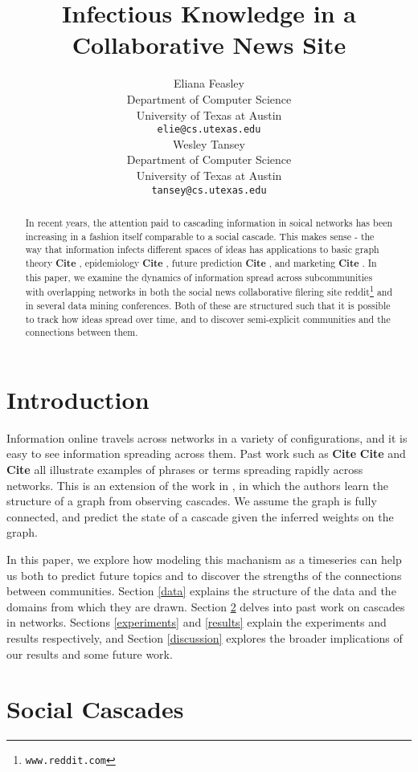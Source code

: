 \documentclass{article} %
\title{Infectious Knowledge in a Collaborative News Site}
\author{
Eliana Feasley\\
Department of Computer Science\\
University of Texas at Austin\\
\texttt{elie@cs.utexas.edu} \\
\And
Wesley Tansey\\
Department of Computer Science\\
University of Texas at Austin\\
\texttt{tansey@cs.utexas.edu} \\
}
\def\c{\textbf{ Cite }}
\begin{document}
\maketitle

\begin{abstract}
In recent years, the attention paid to cascading information in soical networks has been increasing in a fashion itself comparable to a social cascade. This makes sense - the way that information infects different spaces of ideas has applications to basic graph theory\c, epidemiology\c, future prediction\c, and marketing\c. In this paper, we examine the dynamics of information spread across subcommunities with overlapping networks in both the social news collaborative filering site reddit\footnote{\texttt{www.reddit.com}} and in several data mining conferences. Both of these are structured such that it is possible to track how ideas spread over time, and to discover semi-explicit communities and the connections between them.
\end{abstract}

\section{Introduction}
\label{intro}
Information online travels across networks in a variety of configurations, and it is easy to see information spreading across them. Past work such as \c \c and \c all illustrate examples of phrases or terms spreading rapidly across networks.
This is an extension of the work in \cite{netinf}, in which the authors learn the structure of a graph from observing cascades. We assume the graph is fully connected, and predict the state of a cascade given the inferred weights on the graph. 

In this paper, we explore how modeling this machanism as a timeseries can help us both to predict future topics and to discover the strengths of the connections between communities. Section \ref{data} explains the structure of the data and the domains from which they are drawn. Section \ref{cascades} delves into past work on cascades in networks. Sections \ref{experiments} and \ref{results} explain the experiments and results respectively, and Section \ref{discussion} explores the broader implications of our results and some future work. 

\section{Social Cascades}
\label{cascades}
\end{document}
